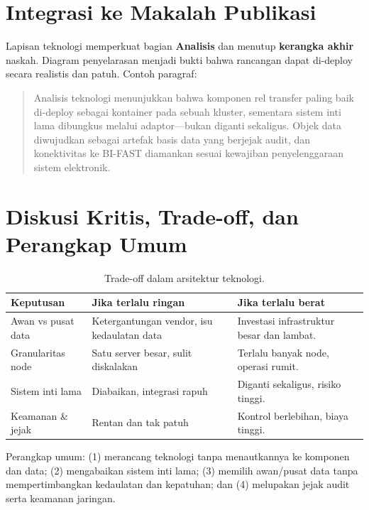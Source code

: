 \section{Integrasi ke Makalah Publikasi}

Lapisan teknologi memperkuat bagian \textbf{Analisis} dan menutup \textbf{kerangka
akhir} naskah. Diagram penyelarasan menjadi bukti bahwa rancangan dapat di-deploy
secara realistis dan patuh. Contoh paragraf:

\begin{quote}
Analisis teknologi menunjukkan bahwa komponen rel transfer paling baik di-deploy
sebagai kontainer pada sebuah kluster, sementara sistem inti lama dibungkus melalui
adaptor---bukan diganti sekaligus. Objek data diwujudkan sebagai artefak basis
data yang berjejak audit, dan konektivitas ke BI-FAST diamankan sesuai kewajiban
penyelenggaraan sistem elektronik.
\end{quote}

\section{Diskusi Kritis, Trade-off, dan Perangkap Umum}

\begin{table}[htbp]
\centering
\scriptsize
\caption{Trade-off dalam arsitektur teknologi.}
\label{tab:tradeoff-bab7-tech}
\begin{tabularx}{\textwidth}{@{}p{} X X@{}}
\hline
\textbf{Keputusan} & \textbf{Jika terlalu ringan} & \textbf{Jika terlalu berat} \\
\hline
Awan vs pusat data & Ketergantungan vendor, isu kedaulatan data & Investasi
infrastruktur besar dan lambat. \\
Granularitas node & Satu server besar, sulit diskalakan & Terlalu banyak node,
operasi rumit. \\
Sistem inti lama & Diabaikan, integrasi rapuh & Diganti sekaligus, risiko tinggi. \\
Keamanan \& jejak & Rentan dan tak patuh & Kontrol berlebihan, biaya tinggi. \\
\hline
\end{tabularx}
\end{table}

Perangkap umum: (1) merancang teknologi tanpa menautkannya ke komponen dan data;
(2) mengabaikan sistem inti lama; (3) memilih awan/pusat data tanpa
mempertimbangkan kedaulatan dan kepatuhan; dan (4) melupakan jejak audit serta
keamanan jaringan.

